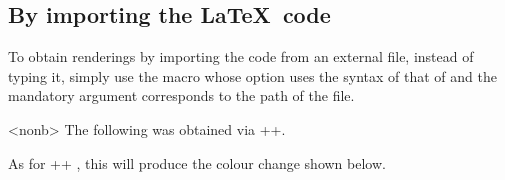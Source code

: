 \documentclass[10pt, a4paper]{article}
\begin{document}

\subsection{By importing the \LaTeX\ code}

To obtain renderings by importing the code from an external file, instead of typing it, simply use the  macro whose option uses the syntax of that of  and the mandatory argument corresponds to the path of the file.

\begin{tdocexa}<nonb>
    The following was obtained via \tdocinlatex++.

    \medskip


    \medskip

    As for \tdocinlatex++ , this will produce the colour change shown below.

    \medskip

\end{tdocexa}
\end{document}
